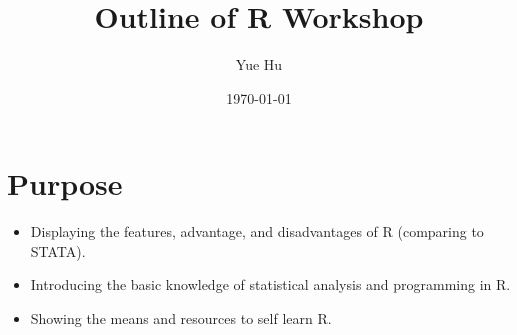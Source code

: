 \documentclass[12pt]{scrartcl}
\author{Yue Hu}
\begin{document}
	\title{Outline of R Workshop}
	\date{\today}
	\maketitle
	
	\setlength{\parindent}{2em} %
	
\section{Purpose}
\begin{itemize}
	\item Displaying the features, advantage, and disadvantages of R (comparing to STATA). 
	\item Introducing the basic knowledge of statistical analysis and programming in R.
	\item Showing the means and resources to self learn R.
\end{itemize}
\end{document}
